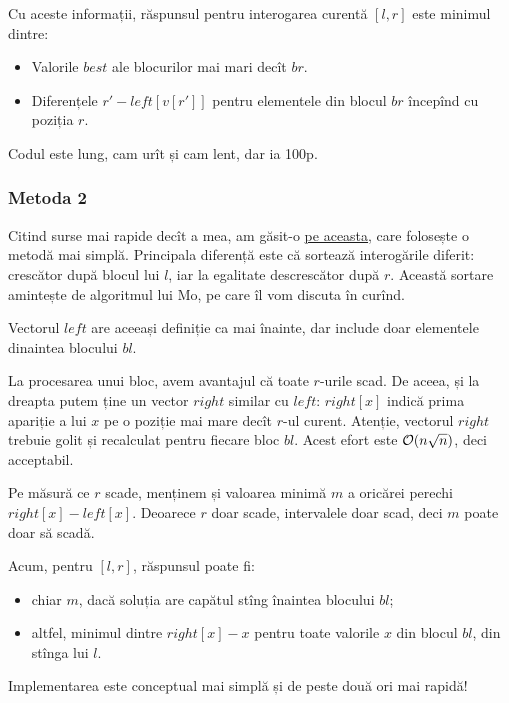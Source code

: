 \documentclass[../main.tex]{subfiles}
\begin{document}
Cu aceste informații, răspunsul pentru interogarea curentă $[l,r]$ este minimul dintre:

\begin{itemize}
  \item Valorile $best$ ale blocurilor mai mari decît $br$.
  \item Diferențele $r'-left[v[r']]$ pentru elementele din blocul $br$ începînd cu poziția $r$.
\end{itemize}

Codul este lung, cam urît și cam lent, dar ia 100p.

\subsubsection*{Metoda 2}

Citind surse mai rapide decît a mea, am găsit-o \href{https://infoarena.ro/job_detail/3032904?action=view-source}{pe aceasta}, care folosește o metodă mai simplă. Principala diferență este că sortează interogările diferit: crescător după blocul lui $l$, iar la egalitate descrescător după $r$. Această sortare amintește de algoritmul lui Mo, pe care îl vom discuta în curînd.

Vectorul $left$ are aceeași definiție ca mai înainte, dar include doar elementele dinaintea blocului $bl$.

La procesarea unui bloc, avem avantajul că toate $r$-urile scad. De aceea, și la dreapta putem ține un vector $right$ similar cu $left$: $right[x]$ indică prima apariție a lui $x$ pe o poziție mai mare decît $r$-ul curent. Atenție, vectorul $right$ trebuie golit și recalculat pentru fiecare bloc $bl$. Acest efort este $\mathcal{O}(n \sqrt{n})$, deci acceptabil.

Pe măsură ce $r$ scade, menținem și valoarea minimă $m$ a oricărei perechi $right[x]-left[x]$. Deoarece $r$ doar scade, intervalele doar scad, deci $m$ poate doar să scadă.

Acum, pentru $[l,r]$, răspunsul poate fi:

\begin{itemize}
  \item chiar $m$, dacă soluția are capătul stîng înaintea blocului $bl$;
  \item altfel, minimul dintre $right[x]-x$ pentru toate valorile $x$ din blocul $bl$, din stînga lui $l$.
\end{itemize}

Implementarea este conceptual mai simplă și de peste două ori mai rapidă!
\end{document}
